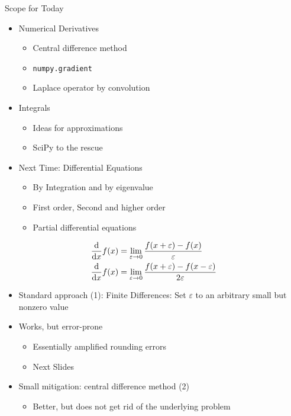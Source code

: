 \begin{frame}{Scope for Today}
%
\begin{itemize}
\item Numerical Derivatives
	\begin{itemize}
	\item Central difference method
	\item \texttt{numpy.gradient}
	\item Laplace operator by convolution
	\end{itemize}
\item Integrals
	\begin{itemize}
	\item Ideas for approximations
	\item SciPy to the rescue
	\end{itemize}
\item Next Time: Differential Equations
	\begin{itemize}
	\item By Integration and by eigenvalue
	\item First order, Second and higher order
	\item Partial differential equations
	\end{itemize}
\end{itemize}
%
\end{frame}


\begin{frame}%
%
\begin{defbox}
\begin{align}
	\dv{x} f(x)
&=
	\lim_{\varepsilon \to 0}
		\dfrac{f(x + \varepsilon) - f(x)}{\varepsilon}
\\
	\dv{x} f(x)
&=
	\lim_{\varepsilon \to 0}
		\dfrac{f(x + \varepsilon) - f(x - \varepsilon)}{2\varepsilon}
\end{align}
\end{defbox}
%
\begin{itemize}
\item Standard approach (1): Finite Differences: Set $\varepsilon$ to an arbitrary small but nonzero value
\item Works, but error-prone
	\begin{itemize}
	\item Essentially amplified rounding errors
	\item Next Slides
	\end{itemize}
\item Small mitigation: central difference method (2)
	\begin{itemize}
	\item Better, but does not get rid of the underlying problem
	\end{itemize}
\end{itemize}
%
\end{frame}

